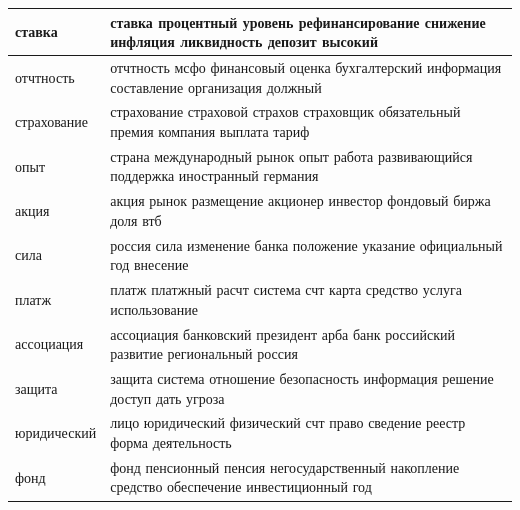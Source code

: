 \documentclass[a4paper, 14pt]{extarticle}
\begin{document}
\begin{landscape}
\begin{small}
\begin{singlespace}
\begin{table}[h]
\begin{tabular}{|l|l|}
				ставка &  ставка процентный уровень рефинансирование снижение инфляция ликвидность депозит высокий \\ \hline
				отчтность &  отчтность мсфо финансовый оценка бухгалтерский информация составление организация должный \\ \hline
				страхование &  страхование страховой страхов страховщик обязательный премия компания выплата тариф \\ \hline
				опыт &  страна международный рынок опыт работа развивающийся поддержка иностранный германия \\ \hline
				акция &  акция рынок размещение акционер инвестор фондовый биржа доля втб \\ \hline
				сила &  россия сила изменение банка положение указание официальный год внесение \\ \hline
				платж &  платж платжный расчт система счт карта средство услуга использование \\ \hline
				ассоциация &  ассоциация банковский президент арба банк российский развитие региональный россия \\ \hline
				защита &  защита система отношение безопасность информация решение доступ дать угроза \\ \hline
				юридический &  лицо юридический физический счт право сведение реестр форма деятельность \\ \hline
				фонд &  фонд пенсионный пенсия негосударственный накопление средство обеспечение инвестиционный год \\ \hline
				\end{tabular}
			\end{table}
		\end{singlespace}
	\end{small}
\end{landscape}
\end{document}
